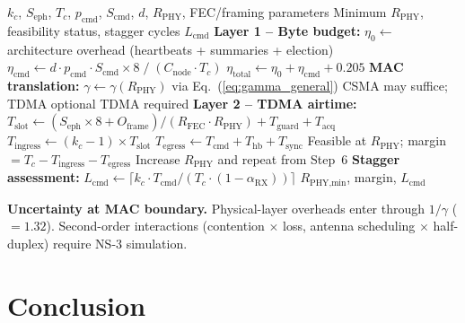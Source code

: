 \documentclass[journal]{IEEEtran}
\begin{document}
\begin{algorithm}[t]
\caption{Coordination Feasibility Test}
\label{alg:feasibility}
\begin{algorithmic}[1]
\REQUIRE $k_c$, $S_{\text{eph}}$, $T_c$, $p_{\text{cmd}}$, $S_{\text{cmd}}$, $d$, $R_{\text{PHY}}$, FEC/framing parameters
\ENSURE Minimum $R_{\text{PHY}}$, feasibility status, stagger cycles $L_{\text{cmd}}$
\STATE \textbf{Layer 1 -- Byte budget:}
\STATE $\eta_0 \leftarrow$ architecture overhead (heartbeats + summaries + election)
\STATE $\eta_{\text{cmd}} \leftarrow d \cdot p_{\text{cmd}} \cdot S_{\text{cmd}} \times 8\;/\;(C_{\text{node}} \cdot T_c)$
\STATE $\eta_{\text{total}} \leftarrow \eta_0 + \eta_{\text{cmd}} + 0.205$ 
\STATE \textbf{MAC translation:}
\STATE $\gamma \leftarrow \gamma(R_{\text{PHY}})$ via Eq.~(\ref{eq:gamma_general})
    \STATE CSMA may suffice; TDMA optional
\ELSE
    \STATE TDMA required
\ENDIF
\STATE \textbf{Layer 2 -- TDMA airtime:}
\STATE $T_{\text{slot}} \leftarrow (S_{\text{eph}} \times 8 + O_{\text{frame}}) / (R_{\text{FEC}} \cdot R_{\text{PHY}}) + T_{\text{guard}} + T_{\text{acq}}$
\STATE $T_{\text{ingress}} \leftarrow (k_c - 1) \times T_{\text{slot}}$
\STATE $T_{\text{egress}} \leftarrow T_{\text{cmd}} + T_{\text{hb}} + T_{\text{sync}}$
    \STATE Feasible at $R_{\text{PHY}}$; margin $= T_c - T_{\text{ingress}} - T_{\text{egress}}$
\ELSE
    \STATE Increase $R_{\text{PHY}}$ and repeat from Step~6
\ENDIF
\STATE \textbf{Stagger assessment:}
\STATE $L_{\text{cmd}} \leftarrow \lceil k_c \cdot T_{\text{cmd}} / (T_c \cdot (1 - \alpha_{\text{RX}})) \rceil$ 
\RETURN $R_{\text{PHY,min}}$, margin, $L_{\text{cmd}}$
\end{algorithmic}
\end{algorithm}

\textbf{Uncertainty at MAC boundary.} Physical-layer overheads enter through $1/\gamma$ ($= 1.32$). Second-order interactions (contention $\times$ loss, antenna scheduling $\times$ half-duplex) require NS-3 simulation.

\section{Conclusion}
\end{document}
